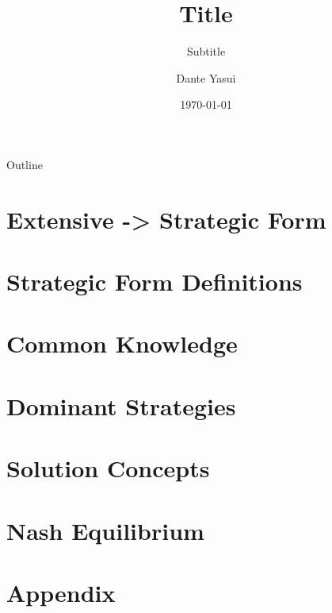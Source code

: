 \documentclass{beamer}
\title{Title}
\subtitle{Subtitle}
\author{Dante Yasui}
\institute{University of Oregon}
\date{\today}
\theoremstyle{plain}
\begin{document}
\begin{frame}[plain]
    \titlepage
\end{frame}
\addtocounter{framenumber}{-1}

\begin{frame}[plain]{Outline}
    \tableofcontents
\end{frame}
\addtocounter{framenumber}{-1}

\section{Extensive -> Strategic Form}

\section{Strategic Form Definitions}

\section{Common Knowledge}

\section{Dominant Strategies}

\section{Solution Concepts}

\section{Nash Equilibrium}






\addtocounter{framenumber}{-1}

\section{Appendix}
\begin{frame}
    \tiny
    
\end{frame}

\end{document}
